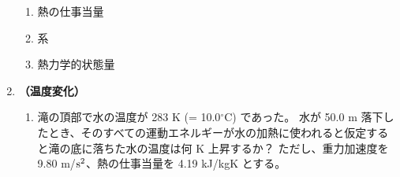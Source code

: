 \documentclass[uplatex,dvipdfmx,a4paper,11pt]{jsarticle}
\begin{document}
\begin{enumerate}
\begin{enumerate}
\item
熱の仕事当量

%

\item
系

%
%
%

\item
熱力学的状態量

%
%

\end{enumerate}

\item
{\bf （温度変化）}

\begin{enumerate}
\item
滝の頂部で水の温度が 283 K (= 10.0${}^\circ$C) であった。
水が 50.0 m 落下したとき、そのすべての運動エネルギーが水の加熱に使われると仮定すると滝の底に落ちた水の温度は何 K 上昇するか？
ただし、重力加速度を 9.80 m/${\rm s}^2$、熱の仕事当量を 4.19 kJ/kgK とする。

%
%


\end{enumerate}
\end{enumerate}
\end{document}

